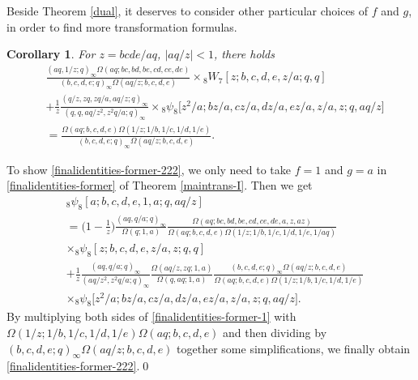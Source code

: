 \documentclass[xits,review,sort&compress]{elsarticle}
\newtheorem{tl}[dl]{Corollary}
\numberwithin{equation}{section}
\newcommand{\poq}[2]{(#1;q)_{#2}}
\def\pf{\noindent {\it Proof.} }
\begin{document}
Beside Theorem \ref{dual}, it deserves to consider other  particular choices of $f$ and $g$, in order to find more transformation formulas.
\begin{tl}\label{maintrans-I-lz} For $z=bcde/aq$, $|aq/z|<1$, there holds
\begin{align}
 &\frac{(aq,1/z; q)_{\infty}\Omega(aq;bc,bd,be,cd,ce,de)}{(b, c, d, e; q)_{\infty}\Omega(aq/z;b,c,d,e)}\times{}_{8} W_{7}[z ; b, c, d, e, z / a; q, q ] \nonumber\\
 &+\frac{1}{z}\frac{\poq{q/z,zq,zq/a,aq/z}{\infty}}{\left(q,q,aq/z^2,z^2q/a;q\right)_{\infty}}\times {}_{8}\psi_{8}\big[z^2/a;bz/a,cz/a,dz/a,
ez/a,z/a,z;q,aq/z\big]\nonumber\\
&=\frac{\Omega(aq;b,c,d,e)\Omega(1/z;1/b,1/c,1/d,
 1/e)}{(b, c, d, e; q)_{\infty}\Omega(aq/z;b,c,d,e)}\label{finalidentities-former-222}.
\end{align}
 \end{tl}
\pf   To show \eqref{finalidentities-former-222}, we only need to take $f=1$ and $g=a$ in \eqref{finalidentities-former} of  Theorem \ref{maintrans-I}. Then we get
\begin{align}
 &{}_{8} \psi_{8}\left[a ; b, c, d, e, 1,a ; q, aq/z\right] \nonumber\\
 &=\bigg(1-\frac{1}{z}\bigg)\frac{(aq, q / a; q)_{\infty}}{\Omega(q;1,a)}\frac{\Omega(aq;bc,bd,be,cd,ce,de,a, z,az)}{\Omega(aq;b,c,d,e)\Omega(1/z;1/b,1/c,1/d,
 1/e,1/aq)}\nonumber\\
  &\times {}_{8} \psi_{8}[z ; b, c, d, e, z / a, z  ; q, q ] \label{finalidentities-former-1}\\
 &+\frac{1}{z}\frac{(aq, q / a; q)_{\infty}}{\left(aq/z^2,z^2q/a;q\right)_{\infty}} \frac{\Omega(aq/z,zq;1,a)}{\Omega(q,aq;1,a)}
 \frac{(b, c, d, e; q)_{\infty}\Omega(aq/z;b,c,d,e)}{\Omega(aq; b,  c, d,  e)\Omega(1/z;1/b,1/c,1/d,1/e)}\nonumber\\
 &\times {}_{8}\psi_{8}\big[z^2/a;bz/a,cz/a,dz/a,
ez/a,z/a,z;q,aq/z\big]. \nonumber
\end{align}
By multiplying both sides of \eqref{finalidentities-former-1} with $\Omega(1/z;1/b,1/c,1/d,1/e)\Omega(aq; b,  c, d,  e)$  and then dividing by $(b, c, d, e; q)_{\infty}\Omega(aq/z;b,c,d,e)$ together some simplifications, we finally obtain \eqref{finalidentities-former-222}.\qed
\end{document}
